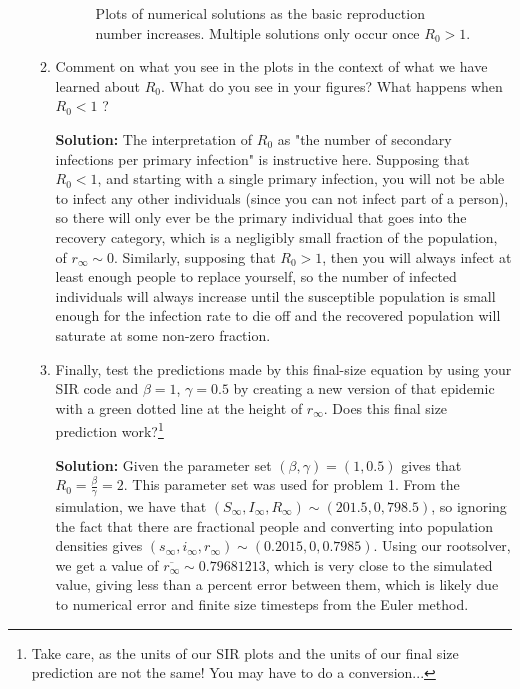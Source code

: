 \documentclass[11pt]{article}
\begin{document}
\begin{enumerate}
\begin{enumerate}[label=\alph*.]
\begin{figure}[H]
			\caption{Plots of numerical solutions as the basic reproduction number increases. Multiple solutions only occur once $R_0>1$.}
		\end{figure}
		\item Comment on what you see in the plots in the context of what we have learned about $R_0$. What do you see in your figures? What happens when $R_0 < 1$ ?
		\begin{tcolorbox}[breakable]
			\textbf{Solution:}
			The interpretation of $R_0$ as "the number of secondary infections per primary infection" is instructive here. Supposing that $R_0<1$, and starting with a single primary infection, you will not be able to infect any other individuals (since you can not infect part of a person), so there will only ever be the primary individual that goes into the recovery category, which is a negligibly small fraction of the population, of $r_\infty\sim 0$. Similarly, supposing that $R_0>1$, then you will always infect at least enough people to replace yourself, so the number of infected individuals will always increase until the susceptible population is small enough for the infection rate to die off and the recovered population will saturate at some non-zero fraction. 
		\end{tcolorbox}
		\item Finally, test the predictions made by this final-size equation by using your SIR code and $\beta=1$, $\gamma=0.5$ by creating a new version of that epidemic with a green dotted line at the height of $r_\infty$. Does this final size prediction work?\footnote{Take care, as the units of our SIR plots and the units of our final size prediction are not the same! You may have to do a conversion...}
		\begin{tcolorbox}[breakable]
			\textbf{Solution:}
			Given the parameter set $(\beta, \gamma)=(1, 0.5)$ gives that $R_0=\frac{\beta}{\gamma}=2$. This parameter set was used for problem 1. From the simulation, we have that $(S_\infty, I_\infty, R_\infty)\sim(201.5,0,798.5)$, so ignoring the fact that there are fractional people and converting into population densities gives $(s_\infty, i_\infty, r_\infty)\sim(0.2015,0,0.7985)$. Using our rootsolver, we get a value of $\overline{r_\infty}\sim  0.79681213$, which is very close to the simulated value, giving less than a percent error between them, which is likely due to numerical error and finite size timesteps from the Euler method.
		\end{tcolorbox}
	\end{enumerate}
	


\end{enumerate}
\end{document}
